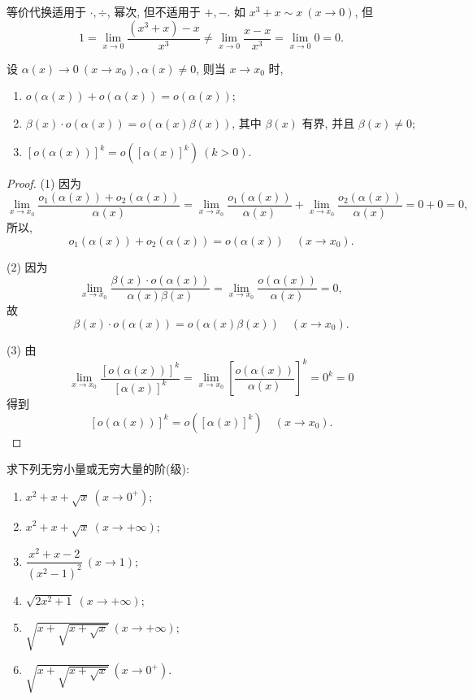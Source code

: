 \begin{example}\label{ex:2.3.4}
等价代换适用于 $\cdot, \div$, 幂次, 但不适用于 $+,-$. 如 $x^3+x \sim x\ (x \to 0)$, 但
\[
1 = \lim_{x\to0}\frac{(x^3+x)-x}{x^3} \neq \lim_{x\to0}\frac{x-x}{x^3} = \lim_{x\to0} 0 = 0.
\]
\end{example}

\begin{example}\label{ex:2.3.5}
设 $\alpha(x) \to 0\ (x \to x_0), \alpha(x) \neq 0$, 则当 $x \to x_0$ 时,
\begin{enumerate}[label=(\arabic*)]
  \item $o(\alpha(x)) + o(\alpha(x)) = o(\alpha(x))$;
  \item $\beta(x)\cdot o(\alpha(x)) = o(\alpha(x)\beta(x))$, 其中 $\beta(x)$ 有界, 并且 $\beta(x) \neq 0$;
  \item $[o(\alpha(x))]^k = o([\alpha(x)]^k)\ (k > 0)$.
\end{enumerate}
\end{example}

\begin{proof}
(1) 因为
\[
\lim_{x\to x_0}\frac{o_1(\alpha(x)) + o_2(\alpha(x))}{\alpha(x)} = \lim_{x\to x_0}\frac{o_1(\alpha(x))}{\alpha(x)} + \lim_{x\to x_0}\frac{o_2(\alpha(x))}{\alpha(x)} = 0 + 0 = 0,
\]
所以,
\[
o_1(\alpha(x)) + o_2(\alpha(x)) = o(\alpha(x))\quad (x \to x_0).
\]

(2) 因为
\[
\lim_{x\to x_0}\frac{\beta(x)\cdot o(\alpha(x))}{\alpha(x)\beta(x)} = \lim_{x\to x_0}\frac{o(\alpha(x))}{\alpha(x)} = 0,
\]
故
\[
\beta(x)\cdot o(\alpha(x)) = o(\alpha(x)\beta(x))\quad (x \to x_0).
\]

(3) 由
\[
\lim_{x\to x_0}\frac{[o(\alpha(x))]^k}{[\alpha(x)]^k} = \lim_{x\to x_0}\left[\frac{o(\alpha(x))}{\alpha(x)}\right]^k = 0^k = 0
\]
得到
\[
[o(\alpha(x))]^k = o([\alpha(x)]^k)\quad (x \to x_0).
\]
\end{proof}

\begin{example}\label{ex:2.3.6}
求下列无穷小量或无穷大量的阶(级):
\begin{enumerate}[label=(\arabic*)]
  \item $x^2 + x + \sqrt{x}\ (x \to 0^+)$;
  \item $x^2 + x + \sqrt{x}\ (x \to +\infty)$;
  \item $\dfrac{x^2 + x - 2}{(x^2 - 1)^2}\ (x \to 1)$;
  \item $\sqrt{2x^2 + 1}\ (x \to +\infty)$;
  \item $\sqrt{x + \sqrt{x + \sqrt{x}}}\ (x \to +\infty)$;
  \item $\sqrt{x + \sqrt{x + \sqrt{x}}}\ (x \to 0^+)$.
\end{enumerate}
\end{example}

